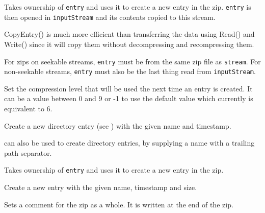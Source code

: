 \label{wxzipoutputstreamcopyentry}


Takes ownership of {\tt entry} and uses it to create a new entry
in the zip. {\tt entry} is then opened in {\tt inputStream} and its contents
copied to this stream.

CopyEntry() is much more efficient than transferring the data using
Read() and Write() since it will copy them without decompressing and
recompressing them.

For zips on seekable streams, {\tt entry} must be from the same zip file
as {\tt stream}. For non-seekable streams, {\tt entry} must also be the
last thing read from {\tt inputStream}.


\label{wxzipoutputstreamlevel}



Set the compression level that will be used the next time an entry is
created. It can be a value between 0 and 9 or -1 to use the default value
which currently is equivalent to 6.


\label{wxzipoutputstreamputnextdirentry}


Create a new directory entry
(see )
with the given name and timestamp.

 can
also be used to create directory entries, by supplying a name with
a trailing path separator.


\label{wxzipoutputstreamputnextentry}


Takes ownership of {\tt entry} and uses it to create a new entry
in the zip. 


Create a new entry with the given name, timestamp and size.


\label{wxzipoutputstreamsetcomment}


Sets a comment for the zip as a whole. It is written at the end of the
zip.

